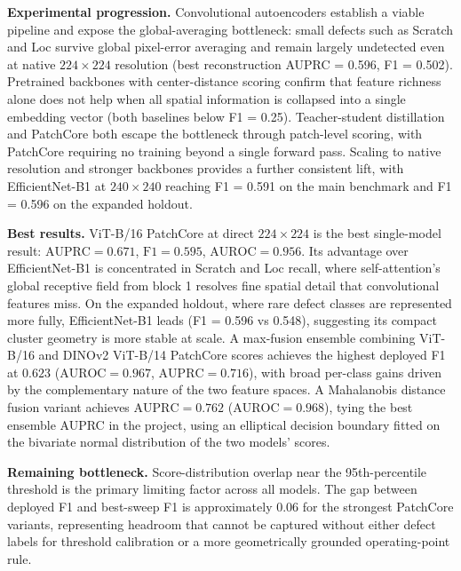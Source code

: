 \documentclass[11pt]{article}
\begin{document}
\textbf{Experimental progression.} Convolutional autoencoders establish a viable pipeline and expose the
global-averaging bottleneck: small defects such as Scratch and Loc survive global pixel-error averaging
and remain largely undetected even at native $224\!\times\!224$ resolution (best reconstruction AUPRC = 0.596, F1 = 0.502).
Pretrained backbones with center-distance scoring confirm that feature richness alone does not help when
all spatial information is collapsed into a single embedding vector (both baselines below F1 = 0.25).
Teacher-student distillation and PatchCore both escape the bottleneck through patch-level scoring,
with PatchCore requiring no training beyond a single forward pass. Scaling to native resolution and
stronger backbones provides a further consistent lift, with EfficientNet-B1 at $240\!\times\!240$
reaching F1 = 0.591 on the main benchmark and F1 = 0.596 on the expanded holdout.

\textbf{Best results.} ViT-B/16 PatchCore at direct $224\!\times\!224$ is the best single-model result:
$\mathrm{AUPRC}=0.671$, $\mathrm{F1}=0.595$, $\mathrm{AUROC}=0.956$. Its advantage over
EfficientNet-B1 is concentrated in Scratch and Loc recall, where self-attention's global receptive field
from block 1 resolves fine spatial detail that convolutional features miss. On the expanded holdout, where
rare defect classes are represented more fully, EfficientNet-B1 leads (F1 = 0.596 vs 0.548), suggesting
its compact cluster geometry is more stable at scale.
A max-fusion ensemble combining ViT-B/16 and DINOv2 ViT-B/14 PatchCore scores achieves the highest
deployed F1 at $0.623$ ($\mathrm{AUROC}=0.967$, $\mathrm{AUPRC}=0.716$), with broad per-class gains driven by
the complementary nature of the two feature spaces. A Mahalanobis distance fusion variant achieves $\mathrm{AUPRC}=0.762$ ($\mathrm{AUROC}=0.968$),
tying the best ensemble AUPRC in the project, using an elliptical decision boundary
fitted on the bivariate normal distribution of the two models' scores.

\textbf{Remaining bottleneck.} Score-distribution overlap near the 95th-percentile threshold is the primary
limiting factor across all models. The gap between deployed F1 and best-sweep F1 is approximately 0.06
for the strongest PatchCore variants, representing headroom that cannot be captured without either defect
labels for threshold calibration or a more geometrically grounded operating-point rule.
\end{document}
